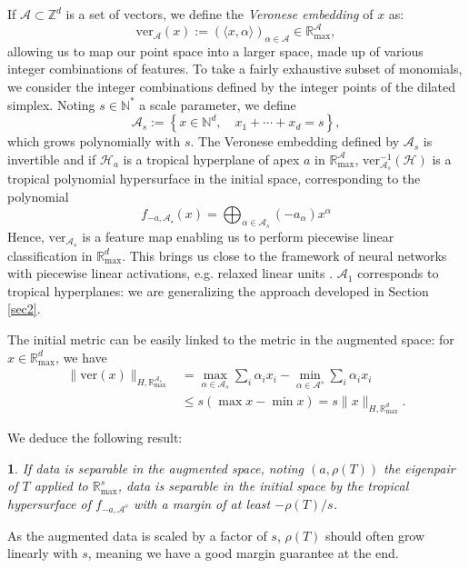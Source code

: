 \documentclass[oneside,english,a4paper]{amsart}
\numberwithin{equation}{section}
\numberwithin{figure}{section}
\theoremstyle{plain}
\theoremstyle{definition}
\theoremstyle{plain}
\newtheorem{prop}[thm]{\protect\propositionname}
\theoremstyle{remark}
\theoremstyle{plain}
\theoremstyle{definition}
\theoremstyle{definition}
\providecommand{\propositionname}{Proposition}
\begin{document}
If $\mathcal{A}\subset\mathbb{Z}^{d}$ is a set of vectors, we define
the \emph{Veronese embedding} of $x$ as:
\[
\text{ver}_{\mathcal{A}}(x):=\left(\langle x,\alpha\rangle\right)_{\alpha\in\mathcal{A}}\in\mathbb{R}_{\max}^{\mathcal{A}},
\]
allowing us to map our point space into a larger space, made up of
various integer combinations of features. To take a fairly exhaustive
subset of monomials, we consider the integer combinations defined
by the integer points of the dilated simplex. Noting $s\in\mathbb{N}^{*}$
a scale parameter, we define
\[
\mathcal{A}_{s}:=\left\{x\in\mathbb{N}^{d},\quad x_{1}+\cdots+x_{d}=s\right\},
\]
which grows polynomially with $s$. The Veronese embedding defined
by $\mathcal{A}_{s}$ is invertible and if $\mathcal{H}_a$ is a tropical
hyperplane of apex $a$ in $\mathbb{R}_{\max}^{\mathcal{A}}$, $\text{ver}_{\mathcal{A}_{s}}^{-1}(\mathcal{H})$
is a tropical polynomial hypersurface in the initial space, corresponding to the polynomial
\[ f_{-a, \mathcal{A_s}}(x)=\bigoplus_{\alpha\in \mathcal{A}_s} (-a_\alpha)x^\alpha \]
Hence, $\text{ver}_{\mathcal{A}_{s}}$ is a feature map
enabling us to perform piecewise linear classification in $\mathbb{R}_{\max}^{d}$. This brings us close to the framework of neural networks with piecewise linear activations, e.g. relaxed linear units \cite{zhang2018tropical}. $\mathcal{A}_1$ corresponds to tropical hyperplanes: we are generalizing the approach developed in Section \ref{sec2}.

The initial metric can be easily linked to the metric in the augmented space: for $x\in\mathbb{R}_{\max}^d$, we have
\begin{align*}
\lVert\text{ver}(x)\rVert_{H,\mathbb{R}^{\mathcal{A}_s}_{\max}}&=\max_{\alpha\in\mathcal{A}_{s}}\sum_{i}\alpha_{i}x_{i}-\min_{\alpha\in\mathcal{A}^{s}}\sum_{i}\alpha_{i}x_{i}\\&\le s(\max x-\min x)=s\lVert x\rVert_{H,\mathbb{R}_{\max}^d}.
\end{align*}

We deduce the following result:
\begin{prop}
If data is separable in the augmented space, noting $(a, \rho(T))$ the eigenpair of $T$ applied to $\mathbb{R}_{\max}^s$, data is separable in the initial space by the tropical hypersurface of $f_{-a,\mathcal{A}^s}$ with a margin of at least $-\rho(T)/s$.
\end{prop}

As the augmented data is scaled by a factor of $s$, $\rho(T)$ should often grow linearly with $s$, meaning we have a good margin guarantee at the end.
\end{document}
